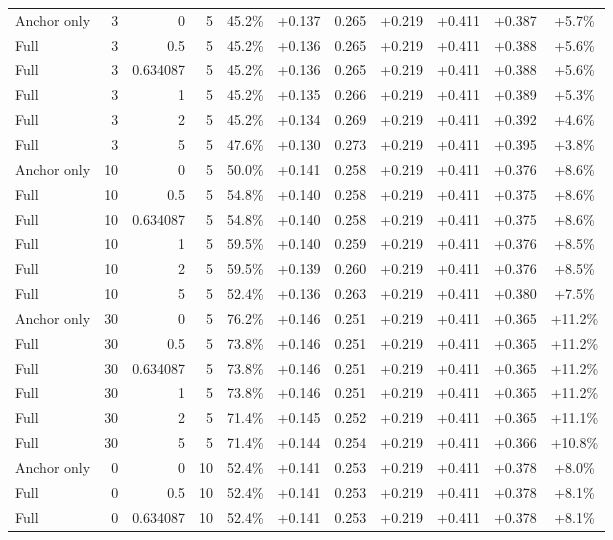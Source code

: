 \begin{table}[htbp]
\begin{tabular}{lrrrccccccc}
Anchor only & 3 & 0 & 5 & 45.2\% & +0.137 & 0.265 & +0.219 & +0.411 & +0.387 & +5.7\% \\
Full & 3 & 0.5 & 5 & 45.2\% & +0.136 & 0.265 & +0.219 & +0.411 & +0.388 & +5.6\% \\
Full & 3 & 0.634087 & 5 & 45.2\% & +0.136 & 0.265 & +0.219 & +0.411 & +0.388 & +5.6\% \\
Full & 3 & 1 & 5 & 45.2\% & +0.135 & 0.266 & +0.219 & +0.411 & +0.389 & +5.3\% \\
Full & 3 & 2 & 5 & 45.2\% & +0.134 & 0.269 & +0.219 & +0.411 & +0.392 & +4.6\% \\
Full & 3 & 5 & 5 & 47.6\% & +0.130 & 0.273 & +0.219 & +0.411 & +0.395 & +3.8\% \\
Anchor only & 10 & 0 & 5 & 50.0\% & +0.141 & 0.258 & +0.219 & +0.411 & +0.376 & +8.6\% \\
Full & 10 & 0.5 & 5 & 54.8\% & +0.140 & 0.258 & +0.219 & +0.411 & +0.375 & +8.6\% \\
Full & 10 & 0.634087 & 5 & 54.8\% & +0.140 & 0.258 & +0.219 & +0.411 & +0.375 & +8.6\% \\
Full & 10 & 1 & 5 & 59.5\% & +0.140 & 0.259 & +0.219 & +0.411 & +0.376 & +8.5\% \\
Full & 10 & 2 & 5 & 59.5\% & +0.139 & 0.260 & +0.219 & +0.411 & +0.376 & +8.5\% \\
Full & 10 & 5 & 5 & 52.4\% & +0.136 & 0.263 & +0.219 & +0.411 & +0.380 & +7.5\% \\
Anchor only & 30 & 0 & 5 & 76.2\% & +0.146 & 0.251 & +0.219 & +0.411 & +0.365 & +11.2\% \\
Full & 30 & 0.5 & 5 & 73.8\% & +0.146 & 0.251 & +0.219 & +0.411 & +0.365 & +11.2\% \\
Full & 30 & 0.634087 & 5 & 73.8\% & +0.146 & 0.251 & +0.219 & +0.411 & +0.365 & +11.2\% \\
Full & 30 & 1 & 5 & 73.8\% & +0.146 & 0.251 & +0.219 & +0.411 & +0.365 & +11.2\% \\
Full & 30 & 2 & 5 & 71.4\% & +0.145 & 0.252 & +0.219 & +0.411 & +0.365 & +11.1\% \\
Full & 30 & 5 & 5 & 71.4\% & +0.144 & 0.254 & +0.219 & +0.411 & +0.366 & +10.8\% \\
Anchor only & 0 & 0 & 10 & 52.4\% & +0.141 & 0.253 & +0.219 & +0.411 & +0.378 & +8.0\% \\
Full & 0 & 0.5 & 10 & 52.4\% & +0.141 & 0.253 & +0.219 & +0.411 & +0.378 & +8.1\% \\
Full & 0 & 0.634087 & 10 & 52.4\% & +0.141 & 0.253 & +0.219 & +0.411 & +0.378 & +8.1\% \\

\end{tabular}
\end{table}
